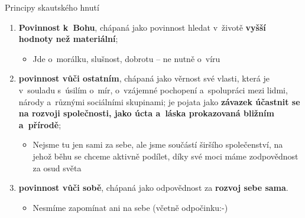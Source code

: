 \documentclass[compress,xelatex,xcolor=dvipsnames,print]{beamer}
\begin{document}
\begin{frame}{Principy skautského hnutí}
\begin{enumerate}
\item \textbf{Povinnost k~Bohu}, chápaná jako povinnost hledat v~životě \textbf{vyšší hodnoty než materiální};
 \begin{itemize}
 \item Jde o~morálku, slušnost, dobrotu -- ne nutně o~víru
 \end{itemize}
\item \textbf{povinnost vůči ostatním}, chápaná jako věrnost své vlasti, která je v~souladu s~úsilím o~mír, o~vzájemné pochopení a~spolupráci mezi lidmi, národy a~různými sociálními skupinami; je pojata jako \textbf{závazek účastnit se na rozvoji společnosti, jako úcta a~láska prokazovaná bližním a~přírodě};
 \begin{itemize}
 \item Nejsme tu jen sami za sebe, ale jsme součástí širšího společenství, na jehož běhu se chceme aktivně podílet, díky své moci máme zodpovědnost za osud světa
 \end{itemize}
\item \textbf{povinnost vůči sobě}, chápaná jako odpovědnost za \textbf{rozvoj sebe sama}.
 \begin{itemize}
 \item Nesmíme zapomínat ani na sebe (včetně odpočinku:-)
 \end{itemize}
\end{enumerate}
\end{frame}
\end{document}
